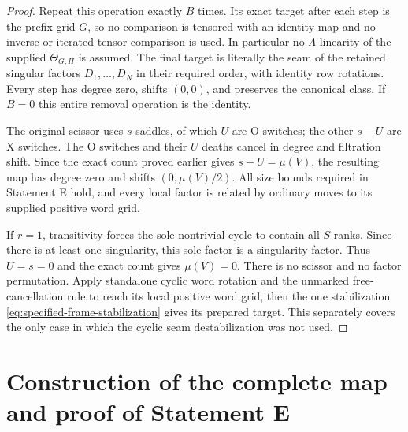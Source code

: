 \documentclass[11pt,a4paper]{article}
\theoremstyle{remark}
\begin{document}
\begin{proof}
Repeat this operation exactly $B$ times.  Its exact target after each
step is the prefix grid $G$, so no comparison is tensored with an
identity map and no inverse or iterated tensor comparison is used.
In particular no $\Lambda$-linearity of the supplied
$\Theta_{G,H}$ is assumed.  The final target is literally the seam
of the retained singular factors $D_1,\ldots,D_N$ in their required
order, with identity row rotations.  Every step has degree zero,
shifts $(0,0)$, and preserves the canonical class.  If $B=0$ this
entire removal operation is the identity.

The original scissor uses $s$ saddles, of which $U$ are O switches;
the other $s-U$ are X switches.  The O switches and their $U$ deaths
cancel in degree and filtration shift.  Since the exact count proved
earlier gives $s-U=\mu(V)$, the resulting map has degree zero and
shifts $(0,\mu(V)/2)$.  All size bounds required in Statement E hold,
and every local factor is related by ordinary moves to its supplied
positive word grid.

If $r=1$, transitivity forces the sole nontrivial cycle to contain all
$S$ ranks.  Since there is at least one singularity, this sole factor
is a singularity factor.  Thus $U=s=0$ and the exact count gives
$\mu(V)=0$.  There is no scissor and no factor permutation.  Apply
standalone cyclic word rotation and the unmarked free-cancellation
rule to reach its local positive word grid, then the one stabilization
\eqref{eq:specified-frame-stabilization} gives its prepared target.
This separately covers the only case in which the cyclic seam
destabilization was not used.

\end{proof}


\section{Construction of the complete map and proof of Statement E}
\label{sec:final-proof}
\end{document}
